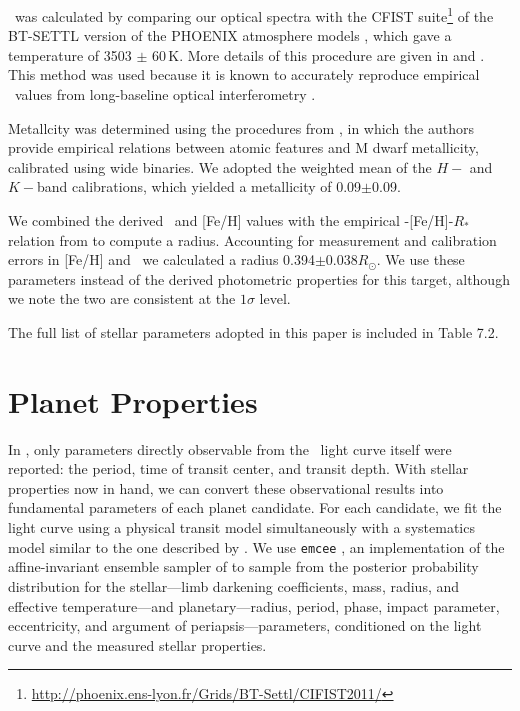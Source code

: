\teff\ was calculated by comparing our optical spectra with the CFIST
suite\footnote{\url{http://phoenix.ens-lyon.fr/Grids/BT-Settl/CIFIST2011/}} of the BT-SETTL
version of the PHOENIX atmosphere models \citep{Allard13}, which gave a temperature
of 3503 $\pm$ 60\,K.
More details of this procedure are given in \citet{Mann14} and
\citet{Gaidos14}.
This method was used because it is known to accurately reproduce empirical
\teff\ values from long-baseline optical interferometry \citet{Boyajian12}.

Metallcity was determined using the procedures from \citet{Mann13a}, in which the
authors provide empirical relations between atomic features and M dwarf
metallicity, calibrated using wide binaries.
We adopted the weighted mean of the $H-$ and $K-$band calibrations,
which yielded a metallicity of 0.09$\pm$0.09.

We combined the derived \teff\ and [Fe/H] values with the empirical
\teff-[Fe/H]-$R_*$ relation from \citet{Mann15} to compute a radius.
Accounting for measurement and calibration errors in [Fe/H] and \teff\ we calculated
a radius 0.394$\pm0.038R_\odot$.
We use these parameters instead of the derived photometric properties for this target,
although we note the two are consistent at the $1\sigma$ level.

The full list of stellar parameters adopted in this paper is included in
Table 7.2.

\section{Planet Properties}

In \paperit, only parameters directly observable from the \KT\ light curve
itself were reported: the period, time of transit center, and transit depth.
With stellar properties now in hand, we can convert these observational
results into fundamental parameters of each planet candidate.
For each candidate, we fit the light curve using a physical transit model
\citep{Mandel02, Kipping10b} simultaneously with a systematics model similar
to the one described by \paperit.
We use \texttt{emcee} \citep{Foreman-Mackey12}, an implementation of the
affine-invariant ensemble sampler of \citet{Goodman10}
 to sample from the posterior probability distribution
for the stellar---limb darkening coefficients, mass, radius, and effective
temperature---and planetary---radius, period, phase, impact parameter,
eccentricity, and argument of periapsis---parameters, conditioned on the
light curve and the measured stellar properties.


